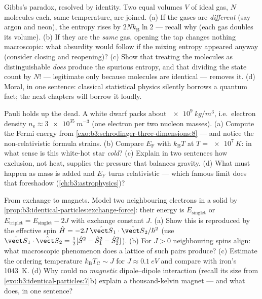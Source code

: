 \begin{exercise}[$\star\star\star$]\label{exo:b3:identical-particles:10}
Gibbs's paradox, resolved by identity. Two equal volumes $V$ of
ideal gas, $N$ molecules each, same temperature, are joined. (a) If
the gases are \emph{different} (say argon and neon), the entropy
rises by $2Nk_{\text{B}}\ln2$ --- recall why (each gas doubles its
volume). (b) If they are the \emph{same} gas, opening the tap
changes nothing macroscopic: what absurdity would follow if the
mixing entropy appeared anyway (consider closing and reopening)?
(c) Show that treating the molecules as distinguishable
\emph{does} produce the spurious entropy, and that dividing the
state count by $N!$ --- legitimate only because molecules are
identical --- removes it. (d) Moral, in one sentence: classical
statistical physics silently borrows a quantum fact; the next
chapters will borrow it loudly.
\end{exercise}

\begin{exercise}[$\star\star\star$]\label{exo:b3:identical-particles:11}
Pauli holds up the dead. A white dwarf packs about
$\qty{e9}{kg/m^3}$, i.e.\ electron density $n_{\text{e}} \approx
\qty{3e35}{m^{-3}}$ (one electron per two nucleon masses). (a)
Compute the Fermi energy from
\cref{exo:b3:schrodinger-three-dimensions:8}
--- and notice the non-relativistic formula strains. (b) Compare
$E_{\text{F}}$ with $k_{\text{B}}T$ at $T = \qty{e7}{K}$: in what
sense is this white-hot star \emph{cold}? (c) Explain in two
sentences how exclusion, not heat, supplies the pressure that
balances gravity. (d) What must happen as mass is added and
$E_{\text{F}}$ turns relativistic --- which famous limit does that
foreshadow (\cref{ch:b3:astrophysics})?
\end{exercise}

\begin{exercise}[$\star\star\star$]\label{exo:b3:identical-particles:12}
From exchange to magnets. Model two neighbouring electrons in a
solid by \cref{prop:b3:identical-particles:exchange-force}: their
energy is $E_{\text{singlet}}$ or $E_{\text{triplet}} =
E_{\text{singlet}} - 2J$ with exchange constant $J$. (a) Show this
is reproduced by the effective spin  $\hat H =
-2J\,\hat{\vect S}_1\cdot\hat{\vect S}_2/\hbar^2$ (use
$\hat{\vect S}_1\cdot\hat{\vect S}_2 = \tfrac12[\hat S^2 - \hat
S_1^2 - \hat S_2^2]$). (b) For $J > 0$ neighbouring spins align:
what macroscopic phenomenon does a lattice of such pairs produce?
(c) Estimate the ordering temperature $k_{\text{B}}T_{\text{C}}
\sim J$ for $J \approx \qty{0.1}{eV}$ and compare with iron's
\qty{1043}{K}. (d) Why could no \emph{magnetic} dipole--dipole
interaction (recall its size from
\cref{exo:b3:identical-particles:7}b) explain a thousand-kelvin
magnet --- and what does, in one sentence?
\end{exercise}


